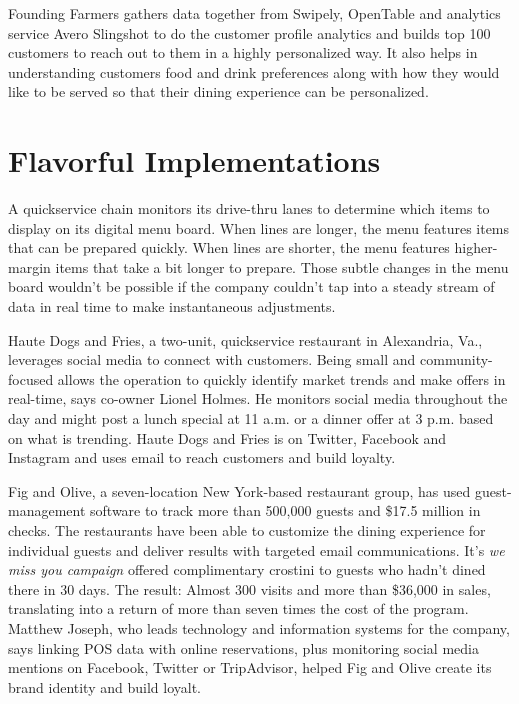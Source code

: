 \documentclass[sigconf]{acmart}
\begin{document}
Founding Farmers gathers data together from Swipely, OpenTable and analytics service Avero Slingshot to do the customer profile analytics and builds top 100 customers to reach out to them in a highly personalized way. 
It also helps in understanding customers food and drink preferences along with how they would like to be served so that their dining experience can be personalized\cite{KooserAmandaC.2013BD}. 

\section{Flavorful Implementations}
A quickservice chain monitors its drive-thru lanes to determine which items to display on its digital menu board. When lines are longer, the menu features items that can be prepared quickly. When lines are shorter, the menu features higher-margin items that take a bit longer to prepare. Those subtle changes in the menu board wouldn't be possible if the company couldn't tap into a steady stream of data in real time to make instantaneous adjustments\cite{www-restaurant}.


Haute Dogs and Fries, a two-unit, quickservice restaurant in Alexandria, Va., leverages social media to connect with customers. Being small and community-focused allows the operation to quickly identify market trends and make offers in real-time, says co-owner Lionel Holmes. He monitors social media throughout the day and might post a lunch special at 11 a.m. or a dinner offer at 3 p.m. based on what is trending. Haute Dogs and Fries is on Twitter, Facebook and Instagram and uses email to reach customers and build loyalty\cite{www-restaurant}.


Fig and Olive, a seven-location New York-based restaurant group, has used guest-management software to track more than 500,000 guests and \$17.5 million in checks. The restaurants have been able to customize the dining experience for individual guests and deliver results with targeted email communications. It's \emph{we miss you campaign} offered complimentary crostini to guests who hadn't dined there in 30 days. The result: Almost 300 visits and more than \$36,000 in sales, translating into a return of more than seven times the cost of the program. Matthew Joseph, who leads technology and information systems for the company, says linking POS data with online reservations, plus monitoring social media mentions on Facebook, Twitter or TripAdvisor, helped Fig and Olive create its brand identity and build loyalt\cite{www-restaurant}.
\end{document}
